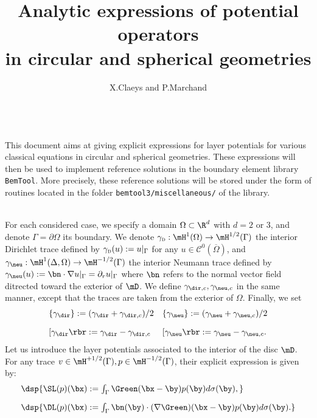 \documentclass[a4paper,11pt]{article}
\date{}
\author{X.Claeys and P.Marchand}
\title{Analytic expressions of potential operators\\ in circular and spherical geometries}
\begin{document}
\maketitle



\quad\\
This document aims at giving explicit  expressions for layer potentials for various classical 
equations in circular and spherical geometries. These expressions will then be used to implement 
reference solutions in the boundary element library \verb?BemTool?. More precisely, these reference 
solutions will be stored under the form of routines located in the folder 
\verb?bemtool3/miscellaneous/? of the library.



\quad\\
For each considered case, we specify a  domain $\Omega\subset \R^{d}$ with $d=2$ or $3$, and denote 
$\Gamma = \partial\Omega$ its boundary. We denote $\gamma_{\textsc{d}}:\mH^{1}(\Omega)\to \mH^{1/2}(\Gamma)$ the 
interior Dirichlet trace defined by $\gamma_{\textsc{d}}(u):= u\vert_{\Gamma}$ for any $u\in \mathscr{C}^{0}(\overline{\Omega})$, 
and  $\gamma_{\neu}:\mH^{1}(\Delta,\Omega)\to \mH^{-1/2}(\Gamma)$ the interior Neumann trace defined by 
$\gamma_{\neu}(u) := \bn\cdot\nabla u\vert_{\Gamma} = \partial_{r}u\vert_{\Gamma}$ where $\bn$ refers to
the normal vector field ditrected toward the exterior of $\mD$. We define $\gamma_{\dir,c},\gamma_{\neu,c}$ in the
same manner, except that the traces are taken from the exterior of $\Omega$. Finally, we set
$$
\begin{array}{ll}
\{\gamma_{\dir}\}:= (\gamma_{\dir}+\gamma_{\dir,c})/2 &  \{\gamma_{\neu}\}:= (\gamma_{\neu}+\gamma_{\neu,c})/2\\[10pt]
\lbrack\gamma_{\dir}\rbr:=\gamma_{\dir}-\gamma_{\dir,c} & \lbrack\gamma_{\neu}\rbr:=\gamma_{\neu}-\gamma_{\neu,c}.
\end{array}
$$
Let us introduce the layer potentials associated to the interior of the disc $\mD$.
For any trace $v\in\mH^{+1/2}(\Gamma), p\in\mH^{-1/2}(\Gamma)$, their explicit expression
is given by:
\begin{equation}\label{PotentialOperators}
\begin{array}{l}
\dsp{ \SL(p)(\bx):=\int_{\Gamma}\Green(\bx-\by)p(\by) d\sigma(\by), }\\[10pt]
\dsp{ \DL(p)(\bx):=\int_{\Gamma}\bn(\by)\cdot(\nabla\Green)(\bx-\by)p(\by) d\sigma(\by). }
\end{array}
\end{equation}
\end{document}
